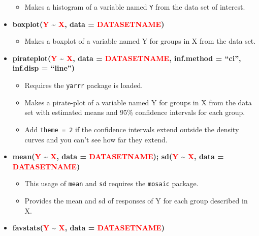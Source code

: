 \documentclass[
]{book}
\providecommand{\tightlist}{%
  \setlength{\itemsep}{0pt}\setlength{\parskip}{0pt}}
\begin{document}
\begin{itemize}
  \begin{itemize}
  \tightlist
  \item
    Makes a histogram of a variable named \texttt{Y} from the data set of
    interest.
  \end{itemize}
\item
  \textbf{boxplot(\textcolor{red}{Y} \textasciitilde{} \textcolor{red}{X}, data = \textcolor{red}{DATASETNAME})}

  \begin{itemize}
  \tightlist
  \item
    Makes a boxplot of a variable named Y for groups in X from the data set.
  \end{itemize}
\item
  \textbf{pirateplot(\textcolor{red}{Y} \textasciitilde{} \textcolor{red}{X}, data = \textcolor{red}{DATASETNAME}, inf.method = ``ci'', inf.disp = ``line'')}

  \begin{itemize}
  \item
    Requires the \texttt{yarrr} package is loaded.
  \item
    Makes a pirate-plot of a variable named Y for groups in X from the data set with estimated means and 95\% confidence intervals for each group. 
  \item
    Add \texttt{theme\ =\ 2} if the confidence intervals extend outside the density curves and you can't see how far they extend.
  \end{itemize}
\item
  \textbf{mean(\textcolor{red}{Y} \textasciitilde{} \textcolor{red}{X}, data = \textcolor{red}{DATASETNAME}); sd(\textcolor{red}{Y} \textasciitilde{} \textcolor{red}{X}, data = \textcolor{red}{DATASETNAME})}

  \begin{itemize}
  \item
    This usage of \texttt{mean} and \texttt{sd} requires the \texttt{mosaic} package.
  \item
    Provides the mean and sd of responses of Y for each group described in X.
  \end{itemize}
\item
  \textbf{favstats(\textcolor{red}{Y} \textasciitilde{} \textcolor{red}{X}, data = \textcolor{red}{DATASETNAME})}


\end{itemize}
\end{document}
